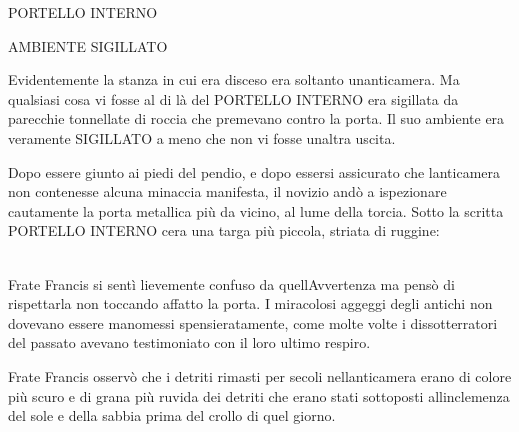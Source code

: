 \begin{center}
	{\Large PORTELLO INTERNO}
\end{center}

\begin{center}
	{\Large AMBIENTE SIGILLATO}
\end{center}

Evidentemente la stanza in cui era disceso era soltanto
un\textquotesingle anticamera. Ma qualsiasi cosa vi fosse al di là del
PORTELLO INTERNO era sigillata da parecchie tonnellate di roccia che
premevano contro la porta. Il suo ambiente era veramente SIGILLATO a
meno che non vi fosse un\textquotesingle altra uscita.

Dopo essere giunto ai piedi del pendio, e dopo essersi assicurato che
l\textquotesingle anticamera non contenesse alcuna minaccia manifesta,
il novizio andò a ispezionare cautamente la porta metallica più da
vicino, al lume della torcia. Sotto la scritta PORTELLO INTERNO
c\textquotesingle era una targa più piccola, striata di ruggine:

\begin{center}
\end{center}
\leavevmode\\
Frate Francis si sentì lievemente confuso da
quell\textquotesingle Avvertenza ma pensò di rispettarla non toccando
affatto la porta. I miracolosi aggeggi degli antichi non dovevano essere
manomessi spensieratamente, come molte volte i dissotterratori del
passato avevano testimoniato con il loro ultimo respiro.

Frate Francis osservò che i detriti rimasti per secoli
nell\textquotesingle anticamera erano di colore più scuro e di grana più
ruvida dei detriti che erano stati sottoposti
all\textquotesingle inclemenza del sole e della sabbia prima del crollo
di quel giorno.

